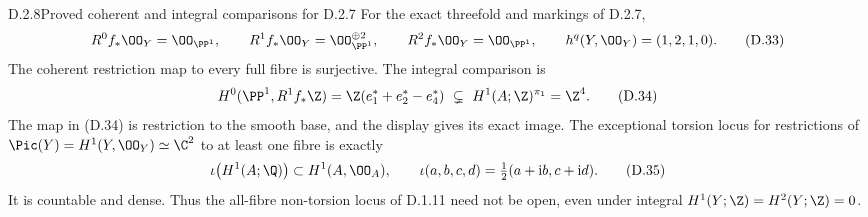 \begin{idstatement}{D.2.8}{Proved coherent and integral comparisons for D.2.7}
\label{st:D.2.8}
For the exact threefold and markings of D.2.7,
\[
 R^0f_*\OO_Y=\OO_{\PP^1},\qquad
 R^1f_*\OO_Y=\OO_{\PP^1}^{\oplus2},\qquad
 R^2f_*\OO_Y=\OO_{\PP^1},
 \qquad h^q(Y,\OO_Y)=(1,2,1,0).
\tag{D.33}
\]
The coherent restriction map to every full fibre is surjective.
The integral comparison is
\[
 H^0(\PP^1,R^1f_*\Z)
   =\Z(e_1^*+e_2^*-e_4^*)
   \ \subsetneq\ H^1(A;\Z)^{\pi_1}=\Z^4.
\tag{D.34}
\]
The map in (D.34) is restriction to the smooth base, and the
display gives its exact image. The exceptional torsion locus
for restrictions of $\Pic(Y)=H^1(Y,\OO_Y)\simeq\C^2$ to
at least one fibre is exactly
\[
 \iota\bigl(H^1(A;\Q)\bigr)\subset H^1(A,\OO_A),
 \qquad
 \iota(a,b,c,d)=\tfrac12(a+\mathrm i b,c+\mathrm i d).
\tag{D.35}
\]
It is countable and dense. Thus the all-fibre non-torsion locus
of D.1.11 need not be open, even under integral
$H^1(Y;\Z)=H^2(Y;\Z)=0$.
\end{idstatement}
